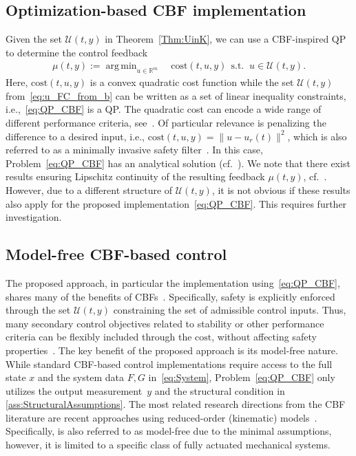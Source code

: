 \documentclass[journal,twoside,web]{ieeeconf}
\DeclareMathOperator*{\argmin}{arg\,min}
\begin{document}
\subsection{Optimization-based CBF implementation}
\label{sec:discuss_opt}
Given the set $\mathcal{U}(t,y)$ in Theorem~\ref{Thm:UinK}, we can use a CBF-inspired QP to determine the control feedback
\begin{equation}\label{eq:QP_CBF}
\begin{aligned}
\mu(t,y):=\argmin_{u\in\mathbb{R}^m}&~\mathrm{cost}(t,u,y) \ \
\text{s.t. } \ u\in\mathcal{U}(t,y).
\end{aligned}
\end{equation}
Here, $\mathrm{cost}(t,u,y)$ is a convex quadratic cost function while the set $\mathcal{U}(t,y)$ from~\eqref{eq:u_FC_from_b} can be written as a set of linear inequality constraints, i.e.,~\eqref{eq:QP_CBF} is a QP. 
The quadratic cost can encode a wide range of different performance criteria,  see~\cite{ames2019control}.
Of particular relevance is penalizing the difference to a desired input, i.e., $\mathrm{cost}(t,u,y)=\|u-u_r(t)\|^2$, which is also referred to as a minimally invasive safety filter~\cite{wabersich2023data}. In this case, Problem~\eqref{eq:QP_CBF} has an analytical solution (cf.~\cite[Eq.~(15)]{cohen2024safety}). 
We note that there exist results ensuring Lipschitz continuity of the resulting feedback $\mu(t,y)$, cf.~\cite{jankovic2018robust}. However, due to a different structure of $\mathcal{U}(t,y)$, it is not obvious if these results also apply for the proposed implementation~\eqref{eq:QP_CBF}. This requires further investigation.
%
\subsection{Model-free CBF-based control}
\label{sec:discuss_CBF}
The proposed approach, in particular the implementation using~\eqref{eq:QP_CBF}, shares many of the benefits of CBFs~\cite{ames2016control,ames2019control}. Specifically, safety is explicitly enforced through the set $\mathcal{U}(t,y)$ constraining the set of admissible control inputs. Thus, many secondary control objectives related to stability or other performance criteria can be flexibly included through the $\mathrm{cost}$, without affecting safety properties~\cite{wabersich2023data}. 
The key benefit of the proposed approach is its model-free nature. While standard CBF-based control implementations require access to the full state $x$ and the system data $F,G$ in~\eqref{eq:System}, Problem~\eqref{eq:QP_CBF} only utilizes the output measurement~$y$ and the structural condition in \cref{ass:StructuralAssumptions}. 
The most related research directions from the CBF literature are recent approaches using reduced-order (kinematic) models~\cite{cohen2024safety,molnar2021model}. Specifically,  \cite{molnar2021model} is also referred to as model-free due to the minimal assumptions, however, it is limited to a specific class of fully actuated mechanical systems. 
\end{document}
